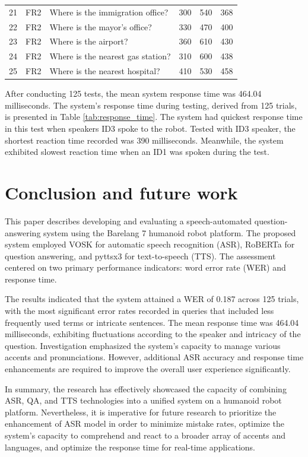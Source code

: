 \documentclass{../styles/svproc}
\begin{document}
\begin{table}[t]
\begin{center}
\begin{tabular}{r@{\quad}r@{\quad}l@{\quad}rrr}
			21 & FR2 & Where is the immigration office? & 300 & 540 & 368 \\
			22 & FR2 & Where is the mayor's office? & 330 & 470 & 400 \\
			23 & FR2 & Where is the airport? & 360 & 610 & 430 \\
			24 & FR2 & Where is the nearest gas station? & 310 & 600 & 438 \\
			25 & FR2 & Where is the nearest hospital? & 410 & 530 & 458 \\[2pt]
			\hline
		\end{tabular}
	\end{center}
\end{table}

After conducting 125 tests, the mean system response time was 464.04 milliseconds. The system's response time during testing, derived from 125 trials, is presented in Table \ref{tab:response_time}. The system had quickest response time in this test when speakers ID3 spoke to the robot. Tested with ID3 speaker, the shortest reaction time recorded was 390 milliseconds. Meanwhile, the system exhibited slowest reaction time when an ID1 was spoken during the test.

\section{Conclusion and future work}
This paper describes developing and evaluating a speech-automated question-answering system using the Barelang 7 humanoid robot platform. The proposed system employed VOSK for automatic speech recognition (ASR), RoBERTa for question answering, and pyttsx3 for text-to-speech (TTS). The assessment centered on two primary performance indicators: word error rate (WER) and response time.

The results indicated that the system attained a WER of 0.187 across 125 trials, with the most significant error rates recorded in queries that included less frequently used terms or intricate sentences. The mean response time was 464.04 milliseconds, exhibiting fluctuations according to the speaker and intricacy of the question. Investigation emphasized the system's capacity to manage various accents and pronunciations. However, additional ASR accuracy and response time enhancements are required to improve the overall user experience significantly.

In summary, the research has effectively showcased the capacity of combining ASR, QA, and TTS technologies into a unified system on a humanoid robot platform. Nevertheless, it is imperative for future research to prioritize the enhancement of ASR model in order to minimize mistake rates, optimize the system's capacity to comprehend and react to a broader array of accents and languages, and optimize the response time for real-time applications.
\end{document}
